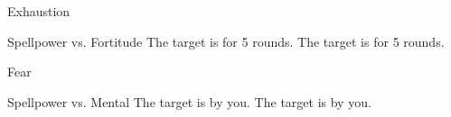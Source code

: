 \begin{spellsection}{Exhaustion}
    \begin{spellheader}
    \end{spellheader}
    \begin{spellcontent}
        \begin{spelltargetinginfo}
        \end{spelltargetinginfo}
        \begin{spelleffects}
            \begin{spellattack}{Spellpower vs. Fortitude}
                \spellsuccess The target is \fatigued for 5 rounds.
                \spellcritical The target is \exhausted for 5 rounds.
            \end{spellattack}
        \end{spelleffects}
    \end{spellcontent}
    \begin{spellfooter}
    \end{spellfooter}
\end{spellsection}

\begin{spellsection}[Lesser]{Fear}
    \begin{spellheader}
    \end{spellheader}
    \begin{spellcontent}
        \begin{spelltargetinginfo}
        \end{spelltargetinginfo}
        \begin{spelleffects}
            \begin{spellattack}{Spellpower vs. Mental}
                \spellcritical The target is \frightened by you.
                \spellsuccess The target is \shaken by you.
            \end{spellattack}
            \spelldur \durshort \dismissable
        \end{spelleffects}
    \end{spellcontent}
    \begin{spellfooter}
        \miscastrandom
    \end{spellfooter}
\end{spellsection}

